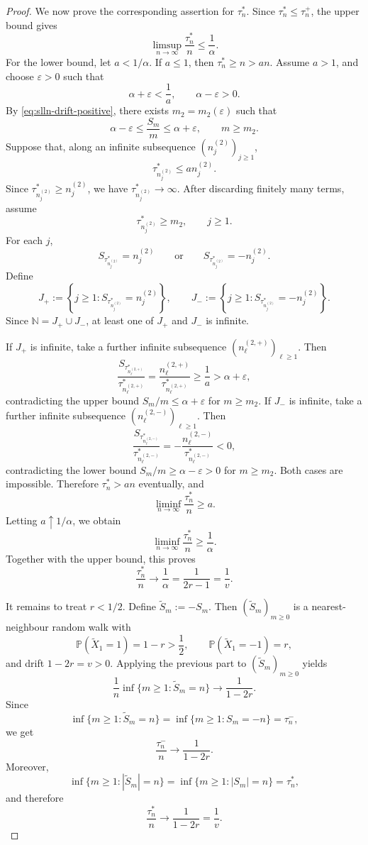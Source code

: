 \documentclass[reqno,final,11pt]{amsart}
\theoremstyle{plain}
\theoremstyle{definition}
\theoremstyle{remark}
\numberwithin{equation}{section}
\begin{document}
\begin{proof}
We now prove the corresponding assertion for \(\tau_n^*\). Since
\(\tau_n^*\le\tau_n^+\), the upper bound gives
\[
  \limsup_{n\to\infty}\frac{\tau_n^*}{n}
  \le
  \frac1\alpha.
\]
For the lower bound, let \(a<1/\alpha\). If \(a\le1\), then
\(\tau_n^*\ge n>an\). Assume \(a>1\), and choose \(\varepsilon>0\) such that
\[
  \alpha+\varepsilon<\frac1a,
  \qquad
  \alpha-\varepsilon>0.
\]
By \eqref{eq:slln-drift-positive}, there exists \(m_2=m_2(\varepsilon)\) such
that
\[
  \alpha-\varepsilon
  \le
  \frac{S_m}{m}
  \le
  \alpha+\varepsilon,
  \qquad m\ge m_2 .
\]
Suppose that, along an infinite subsequence \((n_j^{(2)})_{j\ge1}\),
\[
  \tau_{n_j^{(2)}}^*\le a n_j^{(2)} .
\]
Since \(\tau_{n_j^{(2)}}^*\ge n_j^{(2)}\), we have
\(\tau_{n_j^{(2)}}^*\to\infty\). After discarding finitely many terms, assume
\[
  \tau_{n_j^{(2)}}^*\ge m_2,
  \qquad j\ge1.
\]
For each \(j\),
\[
  S_{\tau_{n_j^{(2)}}^*}=n_j^{(2)}
  \qquad\text{or}\qquad
  S_{\tau_{n_j^{(2)}}^*}=-n_j^{(2)}.
\]
Define
\[
  J_+:=\left\{
    j\ge1:
    S_{\tau_{n_j^{(2)}}^*}=n_j^{(2)}
  \right\},
  \qquad
  J_-:=\left\{
    j\ge1:
    S_{\tau_{n_j^{(2)}}^*}=-n_j^{(2)}
  \right\}.
\]
Since \(\mathbb N=J_+\cup J_-\), at least one of \(J_+\) and \(J_-\) is
infinite.

If \(J_+\) is infinite, take a further infinite subsequence
\((n_\ell^{(2,+)})_{\ell\ge1}\). Then
\[
  \frac{S_{\tau_{n_\ell^{(2,+)}}^*}}{\tau_{n_\ell^{(2,+)}}^*}
  =
  \frac{n_\ell^{(2,+)}}{\tau_{n_\ell^{(2,+)}}^*}
  \ge
  \frac1a
  >
  \alpha+\varepsilon,
\]
contradicting the upper bound \(S_m/m\le\alpha+\varepsilon\) for \(m\ge m_2\).
If \(J_-\) is infinite, take a further infinite subsequence
\((n_\ell^{(2,-)})_{\ell\ge1}\). Then
\[
  \frac{S_{\tau_{n_\ell^{(2,-)}}^*}}{\tau_{n_\ell^{(2,-)}}^*}
  =
  -\frac{n_\ell^{(2,-)}}{\tau_{n_\ell^{(2,-)}}^*}
  <0,
\]
contradicting the lower bound \(S_m/m\ge\alpha-\varepsilon>0\) for
\(m\ge m_2\). Both cases are impossible. Therefore \(\tau_n^*>an\)
eventually, and
\[
  \liminf_{n\to\infty}\frac{\tau_n^*}{n}\ge a.
\]
Letting \(a\uparrow1/\alpha\), we obtain
\[
  \liminf_{n\to\infty}\frac{\tau_n^*}{n}
  \ge
  \frac1\alpha.
\]
Together with the upper bound, this proves
\[
  \frac{\tau_n^*}{n}
  \longrightarrow
  \frac1\alpha
  =
  \frac1{2r-1}
  =
  \frac1v .
\]

It remains to treat \(r<1/2\). Define \(\widetilde S_m:=-S_m\). Then
\((\widetilde S_m)_{m\ge0}\) is a nearest-neighbour random walk with
\[
  \mathbb P(\widetilde X_1=1)=1-r>\frac12,
  \qquad
  \mathbb P(\widetilde X_1=-1)=r,
\]
and drift \(1-2r=v>0\). Applying the previous part to
\((\widetilde S_m)_{m\ge0}\) yields
\[
  \frac1n\inf\{m\ge1:\widetilde S_m=n\}
  \longrightarrow
  \frac1{1-2r}.
\]
Since
\[
  \inf\{m\ge1:\widetilde S_m=n\}
  =
  \inf\{m\ge1:S_m=-n\}
  =
  \tau_n^-,
\]
we get
\[
  \frac{\tau_n^-}{n}
  \longrightarrow
  \frac1{1-2r}.
\]
Moreover,
\[
  \inf\{m\ge1:|\widetilde S_m|=n\}
  =
  \inf\{m\ge1:|S_m|=n\}
  =
  \tau_n^*,
\]
and therefore
\[
  \frac{\tau_n^*}{n}
  \longrightarrow
  \frac1{1-2r}
  =
  \frac1v .
\]
\end{proof}
\end{document}
